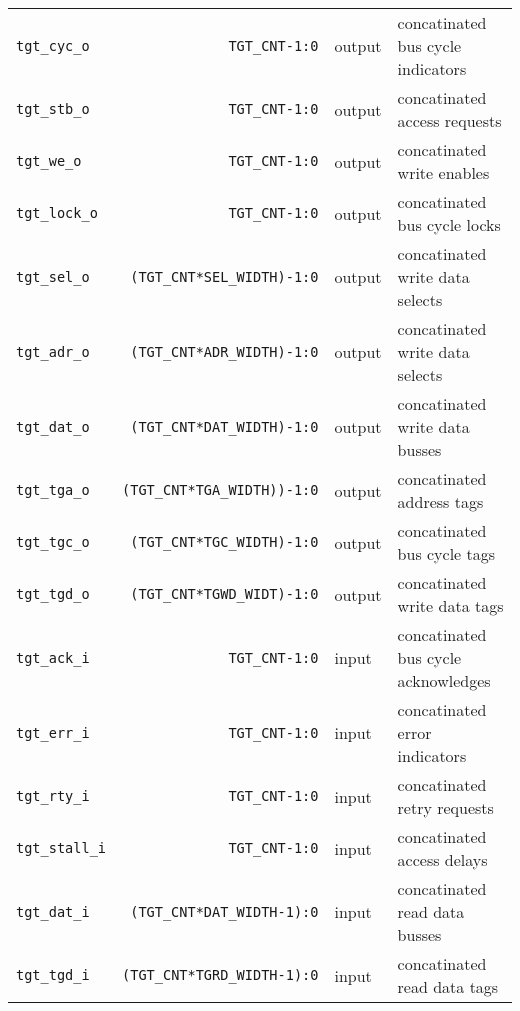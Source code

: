 \begin{center}
\begin{longtable}{|l|r|l|l|}
    \texttt{tgt\_cyc\_o}         & \texttt{TGT\_CNT-1:0}               & output & concatinated bus cycle indicators   \\
    \texttt{tgt\_stb\_o}         & \texttt{TGT\_CNT-1:0}               & output & concatinated access requests	      \\
    \texttt{tgt\_we\_o}          & \texttt{TGT\_CNT-1:0}               & output & concatinated write enables	      \\
    \texttt{tgt\_lock\_o}        & \texttt{TGT\_CNT-1:0}               & output & concatinated bus cycle locks	      \\
    \texttt{tgt\_sel\_o}         & \texttt{(TGT\_CNT*SEL\_WIDTH)-1:0}  & output & concatinated write data selects     \\
    \texttt{tgt\_adr\_o}         & \texttt{(TGT\_CNT*ADR\_WIDTH)-1:0}  & output & concatinated write data selects     \\
    \texttt{tgt\_dat\_o}         & \texttt{(TGT\_CNT*DAT\_WIDTH)-1:0}  & output & concatinated write data busses      \\
    \texttt{tgt\_tga\_o}         & \texttt{(TGT\_CNT*TGA\_WIDTH))-1:0} & output & concatinated address tags	      \\
    \texttt{tgt\_tgc\_o}         & \texttt{(TGT\_CNT*TGC\_WIDTH)-1:0}  & output & concatinated bus cycle tags	      \\
    \texttt{tgt\_tgd\_o}         & \texttt{(TGT\_CNT*TGWD\_WIDT)-1:0}  & output & concatinated write data tags	      \\
    \texttt{tgt\_ack\_i}         & \texttt{TGT\_CNT-1:0}               & input  & concatinated bus cycle acknowledges \\
    \texttt{tgt\_err\_i}         & \texttt{TGT\_CNT-1:0}               & input  & concatinated error indicators	      \\
    \texttt{tgt\_rty\_i}         & \texttt{TGT\_CNT-1:0}               & input  & concatinated retry requests	      \\
    \texttt{tgt\_stall\_i}       & \texttt{TGT\_CNT-1:0}               & input  & concatinated access delays	      \\
    \texttt{tgt\_dat\_i}         & \texttt{(TGT\_CNT*DAT\_WIDTH-1):0}  & input  & concatinated read data busses	      \\
    \texttt{tgt\_tgd\_i}         & \texttt{(TGT\_CNT*TGRD\_WIDTH-1):0} & input  & concatinated read data tags         \\   
  \end{longtable}
\end{center}  
\endgroup

